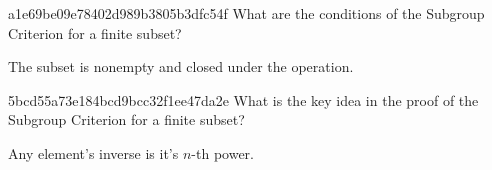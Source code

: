 \begin{note}{a1e69be09e78402d989b3805b3dfc54f}
    What are the conditions of the Subgroup Criterion for a finite subset?

    \begin{cloze}{1}
        The subset is nonempty and closed under the operation.
    \end{cloze}
\end{note}

\begin{note}{5bcd55a73e184bcd9bcc32f1ee47da2e}
    What is the key idea in the proof of the Subgroup Criterion for a finite subset?

    \begin{cloze}{1}
        Any element's inverse is it's \({ n }\)-th power.
    \end{cloze}
\end{note}


